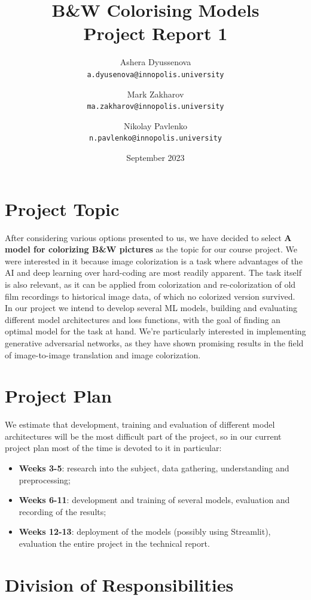 \documentclass[]{article}
\title{B\&W Colorising Models\\Project Report 1\\}
\author{
	Ashera Dyussenova\\
	\texttt{a.dyusenova@innopolis.university}
	\and
	Mark Zakharov\\
	\texttt{ma.zakharov@innopolis.university}
	\and
	Nikolay Pavlenko\\
	\texttt{n.pavlenko@innopolis.university}
}
\date{September 2023}
\begin{document}
	
	\maketitle
	
	\section{Project Topic}
	
	After considering various options presented to us, we have decided to select \textbf{A model for colorizing B\&W pictures} as the topic for our course project. We were interested in it because image colorization is a task where advantages of the AI and deep learning over hard-coding are most readily apparent. The task itself is also relevant, as it can be applied from colorization and re-colorization of old film recordings to historical image data, of which no colorized version survived. \\ In our project we intend to develop several ML models, building and evaluating different model architectures and loss functions, with the goal of finding an optimal model for the task at hand. We're particularly interested in implementing generative adversarial networks, as they have shown promising results in the field of image-to-image translation and image colorization.
	
	\section{Project Plan}
	
	We estimate that development, training and evaluation of different model architectures will be the most difficult part of the project, so in our current project plan most of the time is devoted to it in particular:
	
	\begin{itemize}
		\item \textbf{Weeks 3-5}: research into the subject, data gathering, understanding and preprocessing;
		\item \textbf{Weeks 6-11}: development and training of several models, evaluation and recording of the results;
		\item \textbf{Weeks 12-13}: deployment of the models (possibly using Streamlit), evaluation the entire project in the technical report.
	\end{itemize}
	
	\section{Division of Responsibilities}
	
\end{document}
